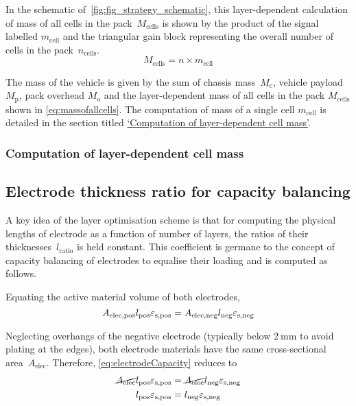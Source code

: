 In  the  schematic  of~\cref{fig:fig_strategy_schematic},  this  layer-dependent
calculation of  mass of all cells  in the pack~$M_\text{cells}$ is  shown by the
product of  the signal  labelled $m_\text{cell}$ and  the triangular  gain block
representing the overall number of cells in the pack~$n_\text{cells}$.
\begin{equation}\label{eq:massofallcells}
    M_\text{cells} = n \times m_\text{cell}
\end{equation}

The   mass    of   the   vehicle    is   given    by   the   sum    of   chassis
mass~$M_\text{c}$,  vehicle  payload  $M_\text{p}$, pack  overhead  $M_\text{o}$
and  the  layer-dependent  mass  of  all  cells  in  the  pack  $M_\text{cells}$
shown   in   \cref{eq:massofallcells}.   The    computation   of   mass   of   a
single   cell    $m_\text{cell}$   is    detailed   in   the    section   titled
\hyperlink{href:layerdependentcellmass}{`Computation  of   layer-dependent  cell
mass'}.

\subsubsection*{\hypertarget{href:layerdependentcellmass}{Computation of layer-dependent cell mass}}\label{sec:massofonecell}

\subsection{Electrode thickness ratio for capacity balancing}\label{sec:electroderatio}

A key  idea of the layer  optimisation scheme is that  for computing the
physical  lengths  of electrode  as  a  function  of number  of  layers,
the  ratios  of  their thicknesses~$l_\text{ratio}$  is  held  constant.
This  coefficient is  germane to  the concept  of capacity  balancing of
electrodes  to equalise  their loading and is computed as follows.

Equating  the active material volume of both electrodes,
\begin{equation}
    A_\text{elec,pos}l_\text{pos}  \varepsilon_\text{s,pos} = A_\text{elec,neg}l_\text{neg}  \varepsilon_\text{s,neg} \label{eq:electrodeCapacity}\\
\end{equation}

Neglecting  overhangs   of  the  negative  electrode   (typically  below
$\SI{2}{\milli\meter}$ to  avoid plating  at the edges),  both electrode
materials have the same cross-sectional area~$A_\text{elec}$. Therefore,
\cref{eq:electrodeCapacity} reduces to
\begin{align}
    \cancel{A_\text{elec}}l_\text{pos}  \varepsilon_\text{s,pos} & = \cancel{A_\text{elec}}l_\text{neg}  \varepsilon_\text{s,neg}  \\
    l_\text{pos}  \varepsilon_\text{s,pos}                       & = l_\text{neg}  \varepsilon_\text{s,neg}\label{eq:electrodeCapequalarea}
\end{align}

